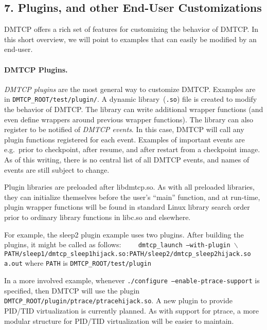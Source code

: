 \documentclass{article}
\begin{document}
\subsection*{7. Plugins, and other End-User Customizations}

DMTCP offers a rich set of features for customizing the behavior of
DMTCP.  In this short overview, we will point to examples that can
easily be modified by an end-user.

\paragraph{DMTCP Plugins.}

{\em DMTCP plugins\/} are the most general way to customize DMTCP.  Examples
are in {\tt DMTCP\_ROOT/test/plugin/}.  A dynamic library~({\tt *.so})
file is created to modify the behavior of DMTCP.  The library can
write additional wrapper functions (and even define wrappers around
previous wrapper functions).  The library can also register
to be notified of {\em DMTCP events}.  In this case, DMTCP will
call any plugin functions registered for each event.
Examples of important events are
\hbox{e.g.}~prior to checkpoint, after resume, and after restart
from a checkpoint image.  As of this writing, there is no central
list of all DMTCP events, and names of events are still subject to change.

Plugin libraries are preloaded after libdmtcp.so.  As with all
preloaded libraries, they can initialize themselves before the user's
``main'' function, and at run-time, plugin wrapper functions will
be found in standard Linux library search order prior to ordinary
library functions in libc.so and elsewhere.

For example, the sleep2 plugin example uses two plugins.  After building
the plugins, it might be called as follows: \newline
{\tt
\hbox{\ \ }  dmtcp\_launch --with-plugin $\backslash$ \newline
\hbox{\ \ \ \ }
 PATH/sleep1/dmtcp\_sleep1hijack.so:PATH/sleep2/dmtcp\_sleep2hijack.so a.out}
 \newline
where {\tt PATH} is {\tt DMTCP\_ROOT/test/plugin}

In a more involved example, whenever {\tt ./configure
--enable-ptrace-support} is specified, then DMTCP will use the plugin
{\tt DMTCP\_ROOT/plugin/ptrace/ptracehijack.so}.  A new plugin to
provide PID/TID virtualization is currently planned.  As with support
for ptrace, a more modular structure for PID/TID virtualization will be
easier to maintain.
\end{document}
